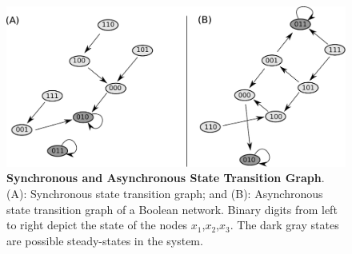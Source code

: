 \begin{figure}[H]
  \centering
    \includegraphics[scale=.7]{./Bilder/asynchronexample.pdf}
  \caption[Synchronous and Asynchronous State Transition Graph]{\textbf{Synchronous and Asynchronous State Transition Graph}. (A): Synchronous state transition graph; and (B): Asynchronous state transition graph of a Boolean network. Binary digits from left to right depict the state of the nodes $x_1$,$x_2$,$x_3$. The dark gray states are possible steady-states in the system.}
\label{fig:Fig.4.}
\end{figure}




